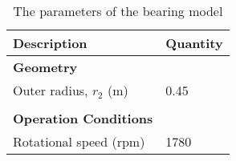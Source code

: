 \documentclass{article}
\begin{document}



\begin{table}[!hbtp]
	\caption[Table of parameters]{The parameters of the bearing model}
	\begin{center}
	\begin{tabular}{l l}
		\hline
		\textbf{Description} & \textbf{Quantity} \\
		\hline
		\textbf{Geometry} & \\
		Outer radius, $r_2$ (m) & 0.45 \\
		\\
		\textbf{Operation Conditions} & \\
		Rotational speed (rpm) & 1780 \\
		\hline
	\end{tabular}
	\end{center}
\end{table}
\end{document}
